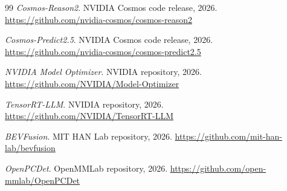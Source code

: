 \documentclass[11pt]{article}
\begin{document}
\begin{thebibliography}{99}
\emph{Cosmos-Reason2}. NVIDIA Cosmos code release, 2026.
\url{https://github.com/nvidia-cosmos/cosmos-reason2}

\emph{Cosmos-Predict2.5}. NVIDIA Cosmos code release, 2026.
\url{https://github.com/nvidia-cosmos/cosmos-predict2.5}

\emph{NVIDIA Model Optimizer}. NVIDIA repository, 2026.
\url{https://github.com/NVIDIA/Model-Optimizer}

\emph{TensorRT-LLM}. NVIDIA repository, 2026.
\url{https://github.com/NVIDIA/TensorRT-LLM}

\emph{BEVFusion}. MIT HAN Lab repository, 2026.
\url{https://github.com/mit-han-lab/bevfusion}

\emph{OpenPCDet}. OpenMMLab repository, 2026.
\url{https://github.com/open-mmlab/OpenPCDet}

\end{thebibliography}
\end{document}
